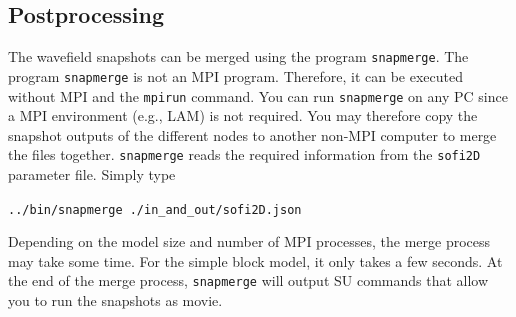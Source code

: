 \subsection{Postprocessing}
The wavefield snapshots can be merged using the program \texttt{snapmerge}. The program \texttt{snapmerge} is not an MPI program. Therefore, it can be executed without MPI and the \texttt{mpirun} command. You can run \texttt{snapmerge} on any PC since a MPI environment (e.g., LAM) is not required. You may therefore copy the snapshot outputs of the different nodes to another non-MPI computer to merge the files together. \texttt{snapmerge} reads the required information from the \texttt{sofi2D} parameter file. Simply type

\texttt{../bin/snapmerge ./in\_and\_out/sofi2D.json}

Depending on the model size and number of MPI processes, the merge process may take some time. For the simple block model, it only takes a few seconds. At the end of the merge process, \texttt{snapmerge} will output SU commands that allow you to run the snapshots as movie.


